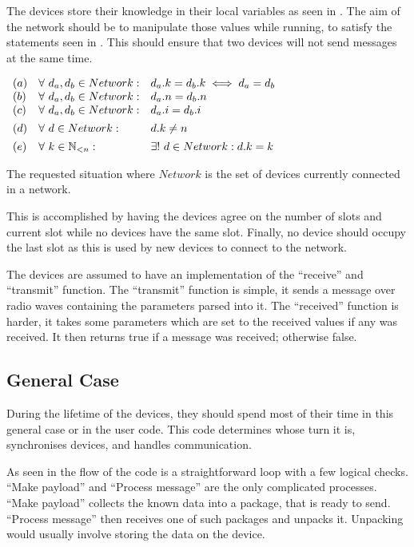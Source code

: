 The devices store their knowledge in their local variables as seen in . 
The aim of the network should be to manipulate those values while running, to satisfy the statements seen in . 
This should ensure that two devices will not send messages at the same time.

\begin{table}[H]
	\centering
	$\begin{array}{l l l}
        (a)&\forall\ d_a, d_b \in Network: & d_a.k = d_b.k  \iff d_a=d_b\\
		(b)&\forall\ d_a, d_b \in Network: & d_a.n = d_b.n \\
		(c)&\forall\ d_a, d_b \in Network: & d_a.i = d_b.i \\[1ex]
		(d)&\forall\ d \in Network: & d.k \neq n \\[1ex]
		(e)&\forall\ k \in \mathbb{N}_{<n}: & \exists!\ d \in Network: d.k = k 
	\end{array}$
	\caption{The requested situation where $Network$ is the set of devices currently connected in a network.}
    \label{tab:invariants}
\end{table}

This is accomplished by having the devices agree on the number of slots and current slot while no devices have the same slot. 
Finally, no device should occupy the last slot as this is used by new devices to connect to the network.

The devices are assumed to have an implementation of the \enquote{receive} and \enquote{transmit} function.
The \enquote{transmit} function is simple, it sends a message over radio waves containing the parameters parsed into it.
The \enquote{received} function is harder, it takes some parameters which are set to the received values if any was received. 
It then returns true if a message was received; otherwise false.
                    
\subsection{General Case} %
\label{sub:general_case}

During the lifetime of the devices, they should spend most of their time in this general case or in the user code. 
This code determines whose turn it is, synchronises devices, and handles communication.

As seen in  the flow of the code is a straightforward loop with a few logical checks. 
\enquote{Make payload} and \enquote{Process message} are the only complicated processes. 
\enquote{Make payload} collects the known data into a package, that is ready to send. 
\enquote{Process message} then receives one of such packages and unpacks it. 
Unpacking would usually involve storing the data on the device.

